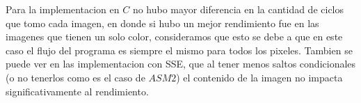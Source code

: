 Para la implementacion en $C$ no hubo mayor diferencia en la cantidad de ciclos que tomo cada imagen, en donde si hubo un mejor rendimiento fue en las imagenes que tienen un solo color, consideramos que esto se debe a que en este caso el flujo del programa es siempre el mismo para todos los pixeles.
Tambien se puede ver en las implementacion con SSE, que al tener menos saltos condicionales (o no tenerlos como es el caso de $ASM2$) el contenido de la imagen no impacta significativamente al rendimiento.







